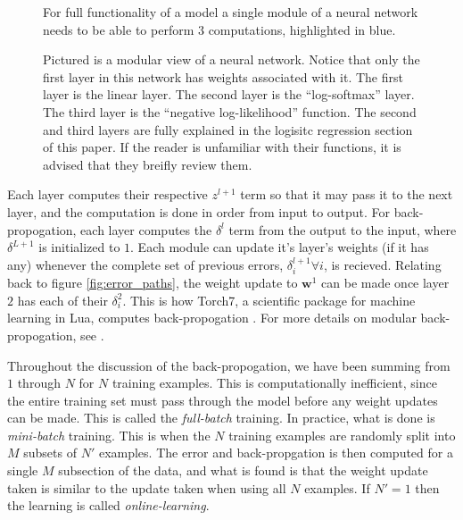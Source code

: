 \message{ !name(main.tex)}\documentclass[11pt]{article}
\begin{document}
\begin{minipage}{0.37\linewidth}
  \begin{figure}[H]
    \centering
    
    \caption{For full functionality of a model a single module of a neural network needs to be able to perform $3$ computations, highlighted in blue.}
    \label{fig:single_module}
  \end{figure}
\end{minipage}\hfill
\begin{minipage}{0.57\linewidth}
  \begin{figure}[H]
    \centering
    
    \caption{Pictured is a modular view of a neural network. Notice that only the first layer in this network has weights associated with it. The first layer is the linear layer. The second layer is the ``log-softmax'' layer. The third layer is the ``negative log-likelihood'' function. The second and third layers are fully explained in the logisitc regression section of this paper. If the reader is unfamiliar with their functions, it is advised that they breifly review them.}
    \label{fig:module_nn}
  \end{figure}
\end{minipage}
\vspace{1cm}

Each layer computes their respective $z^{l+1}$ term so that it may pass it to the next layer, and the computation is done in order from input to output. For back-propogation, each layer computes the $\delta^{l}$ term from the output to the input, where $\delta^{L+1}$ is initialized to $1$. Each module can update it's layer's weights (if it has any) whenever the complete set of previous errors, $\delta_{i}^{l+1} \forall i$, is recieved. Relating back to figure \ref{fig:error_paths}, the weight update to $\mathbf{w}^{1}$ can be made once layer $2$ has each of their $\delta_{i}^{2}$. This is how Torch7, a scientific package for machine learning in Lua, computes back-propogation \cite{torch}. For more details on modular back-propogation, see \cite{Freitas}.

Throughout the discussion of the back-propogation, we have been summing from $1$ through $N$ for $N$ training examples. This is computationally inefficient, since the entire training set must pass through the model before any weight updates can be made. This is called the \emph{full-batch} training. In practice, what is done is \emph{mini-batch} training. This is when the $N$ training examples are randomly split into $M$ subsets of $N'$ examples. The error and back-propgation is then computed for a single $M$ subsection of the data, and what is found is that the weight update taken is similar to the update taken when using all $N$ examples. If $N' = 1$ then the learning is called \emph{online-learning}.
\end{document}
